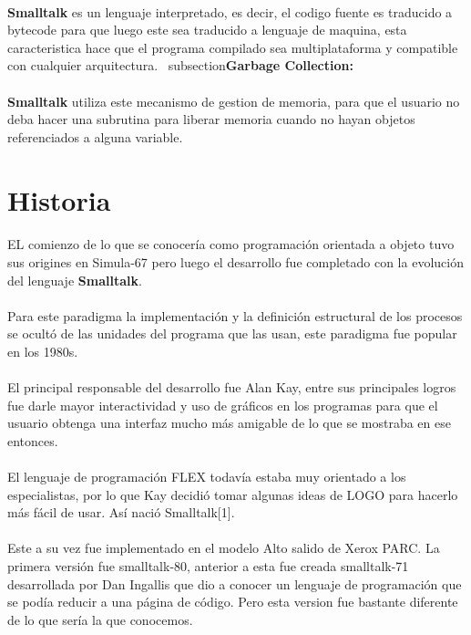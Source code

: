 \documentclass[11pt]{article}
\begin{document}
\paragraph{} \noindent
\textbf{Smalltalk} es un lenguaje interpretado, es decir, el codigo fuente es traducido a bytecode para que luego este sea traducido a lenguaje de maquina, esta caracteristica hace que el programa compilado sea multiplataforma y compatible con cualquier arquitectura.
\ subsection{\textbf{Garbage Collection:}}
\paragraph{} \noindent
\textbf{Smalltalk} utiliza este mecanismo de gestion de memoria, para que el usuario no deba hacer una subrutina para liberar memoria cuando no hayan objetos referenciados a alguna variable.
\section{\textbf{Historia}}
\paragraph{} \noindent
EL comienzo de lo que se conocería como programación orientada a objeto tuvo sus origines en Simula-67 pero luego el desarrollo fue completado con la evolución del lenguaje \textbf{Smalltalk}.
\paragraph{} \noindent
Para este paradigma la implementación y la definición estructural de los procesos se ocultó de las unidades del programa que las usan, este paradigma fue popular en los 1980s.
\paragraph{} \noindent
El principal responsable del desarrollo fue Alan Kay, entre sus principales logros fue darle mayor interactividad y uso de gráficos en los programas para que el usuario obtenga una interfaz mucho más amigable de lo que se mostraba en ese entonces.
\paragraph{} \noindent
El lenguaje de programación FLEX todavía estaba muy orientado a los especialistas, por lo que Kay decidió tomar algunas ideas de LOGO para hacerlo más fácil de usar. Así nació Smalltalk[1].
\paragraph{} \noindent
Este a su vez fue implementado en el modelo Alto salido de Xerox PARC. La primera versión fue smalltalk-80, anterior a esta fue creada smalltalk-71 desarrollada por Dan Ingallis que dio a conocer un lenguaje de programación que se podía reducir a una página de código. Pero esta version fue bastante diferente de lo que sería la que conocemos.
\end{document}

